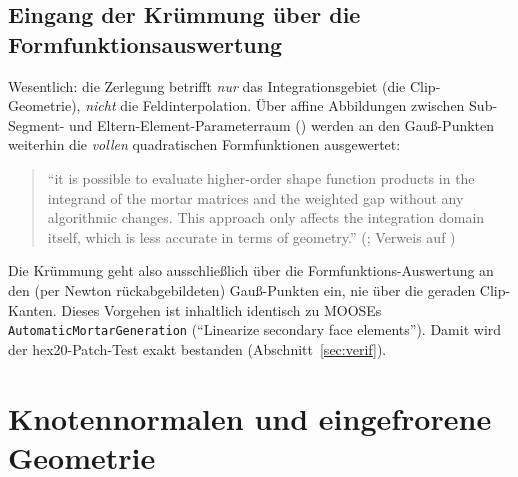 \documentclass[a4paper,11pt]{article}
\newcommand{\code}[1]{\texttt{\small #1}}
\let\stdsection\section
\renewcommand{\section}{\clearpage\stdsection}
\begin{document}
\subsection{Eingang der Krümmung über die Formfunktionsauswertung}
Wesentlich: die Zerlegung betrifft \emph{nur} das Integrationsgebiet (die Clip-Geometrie), \emph{nicht}
die Feldinterpolation. Über affine Abbildungen zwischen Sub-Segment- und Eltern-Element-Parameterraum
(\citealp[Gl.~(31)/(32)]{puso2008}) werden an den Gauß-Punkten weiterhin die \emph{vollen}
quadratischen Formfunktionen ausgewertet:
\begin{quote}
\small ``it is possible to evaluate higher-order shape function products in the integrand of the
mortar matrices and the weighted gap without any algorithmic changes. This approach only affects the
integration domain itself, which is less accurate in terms of geometry.''
\hfill (\citealp[Anh.~A.1.4, S.~215]{farah}; Verweis auf \citealt{puso2008})
\end{quote}
Die Krümmung geht also ausschließlich über die Formfunktions-Auswertung an den (per Newton
rückabgebildeten) Gauß-Punkten ein, nie über die geraden Clip-Kanten. Dieses Vorgehen ist inhaltlich
identisch zu MOOSEs \code{AutomaticMortarGeneration} (``Linearize secondary face elements''). Damit
wird der hex20-Patch-Test exakt bestanden (Abschnitt~\ref{sec:verif}).

\section{Knotennormalen und eingefrorene Geometrie}
\label{sec:normalen}
\end{document}
